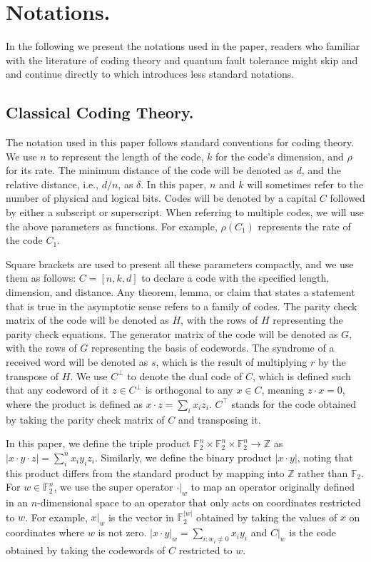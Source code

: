 \documentclass[manuscript,screen,review]{acmart}
\begin{document}
{  \section{ Notations. } In the following we present the notations used in the paper, readers who familiar with the literature of coding theory and quantum fault tolerance might skip  and  and continue directly to  which introduces less standard notations. 


  \subsection{Classical Coding Theory.} \label{sec:classical} The notation used in this paper follows standard conventions for coding theory. We use $n$ to represent the length of the code, $k$ for the code's dimension, and $\rho$ for its rate. The minimum distance of the code will be denoted as $d$, and the relative distance, i.e., $d/n$, as $\delta$. In this paper, $n$ and $k$ will sometimes refer to the number of physical and logical bits. Codes will be denoted by a capital $C$ followed by either a subscript or superscript. When referring to multiple codes, we will use the above parameters as functions. For example, $\rho(C_{1})$ represents the rate of the code $C_{1}$.

Square brackets are used to present all these parameters compactly, and we use them as follows: $C=[n,k,d]$ to declare a code with the specified length, dimension, and distance. Any theorem, lemma, or claim that states a statement that is true in the asymptotic sense refers to a family of codes. The parity check matrix of the code will be denoted as $H$, with the rows of $H$ representing the parity check equations. The generator matrix of the code will be denoted as $G$, with the rows of $G$ representing the basis of codewords. The syndrome of a received word will be denoted as $s$, which is the result of multiplying $r$ by the transpose of $H$. We use $C^\perp$ to denote the dual code of $C$, which is defined such that any codeword of it $z\in C^\perp$ is orthogonal to any $x\in C$, meaning $z\cdot x = 0$, where the product is defined as $x\cdot z = \sum_{i}{x_{i}z_{i}}$. $C^{\top}$ stands for the code obtained by taking the parity check matrix of $C$ and transposing it.

In this paper, we define the triple product $\mathbb{F}_2^{n}\times \mathbb{F}_2^{n}\times\mathbb{F}_2^{n} \rightarrow \mathbb{Z}$ as $|x\cdot y \cdot z| = \sum_{i}^{n}{x_{i}y_{i}z_{i}}$. Similarly, we define the binary product $|x \cdot y|$, noting that this product differs from the standard product by mapping into $\mathbb{Z}$ rather than $\mathbb{F}_{2}$. For $w \in \mathbb{F}_{2}^{n}$, we use the super operator $ \cdot |_{w} $ to map an operator originally defined in an $n$-dimensional space to an operator that only acts on coordinates restricted to $w$. For example, $x|_{w}$ is the vector in $\mathbb{F}_{2}^{|w|}$ obtained by taking the values of $x$ on coordinates where $w$ is not zero. $|x\cdot y|_{w} = \sum_{i:w_{i}\neq 0}{x_{i}y_{i}}$ and $C|_{w}$ is the code obtained by taking the codewords of $C$ restricted to $w$.




}
\end{document}
